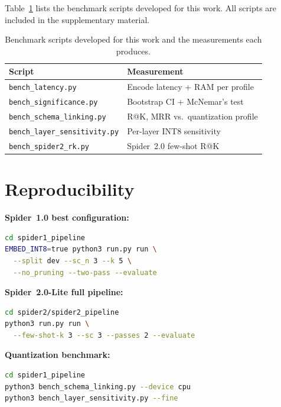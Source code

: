 Table~\ref{tab:tools} lists the benchmark scripts developed for this work.
All scripts are included in the supplementary material.

\begin{table}[!h]
  \centering
  \caption[Benchmark scripts]{Benchmark scripts developed for this work
    and the measurements each produces.}
  \label{tab:tools}
  \begin{tabular}{ll}
    \toprule
    Script & Measurement \\
    \midrule
    \texttt{bench\_latency.py}           & Encode latency + RAM per profile \\
    \texttt{bench\_significance.py}      & Bootstrap CI + McNemar's test \\
    \texttt{bench\_schema\_linking.py}   & R@K, MRR vs.\ quantization profile \\
    \texttt{bench\_layer\_sensitivity.py}& Per-layer INT8 sensitivity \\
    \texttt{bench\_spider2\_rk.py}       & Spider~2.0 few-shot R@K \\
    \bottomrule
  \end{tabular}
\end{table}

\section{Reproducibility}
\label{app:repro}

\textbf{Spider~1.0 best configuration:}
\begin{lstlisting}[language=bash,basicstyle=\small\ttfamily,breaklines=true]
cd spider1_pipeline
EMBED_INT8=true python3 run.py run \
  --split dev --sc_n 3 --k 5 \
  --no_pruning --two-pass --evaluate
\end{lstlisting}

\textbf{Spider~2.0-Lite full pipeline:}
\begin{lstlisting}[language=bash,basicstyle=\small\ttfamily,breaklines=true]
cd spider2/spider2_pipeline
python3 run.py run \
  --few-shot-k 3 --sc 3 --passes 2 --evaluate
\end{lstlisting}

\textbf{Quantization benchmark:}
\begin{lstlisting}[language=bash,basicstyle=\small\ttfamily,breaklines=true]
cd spider1_pipeline
python3 bench_schema_linking.py --device cpu
python3 bench_layer_sensitivity.py --fine
\end{lstlisting}

